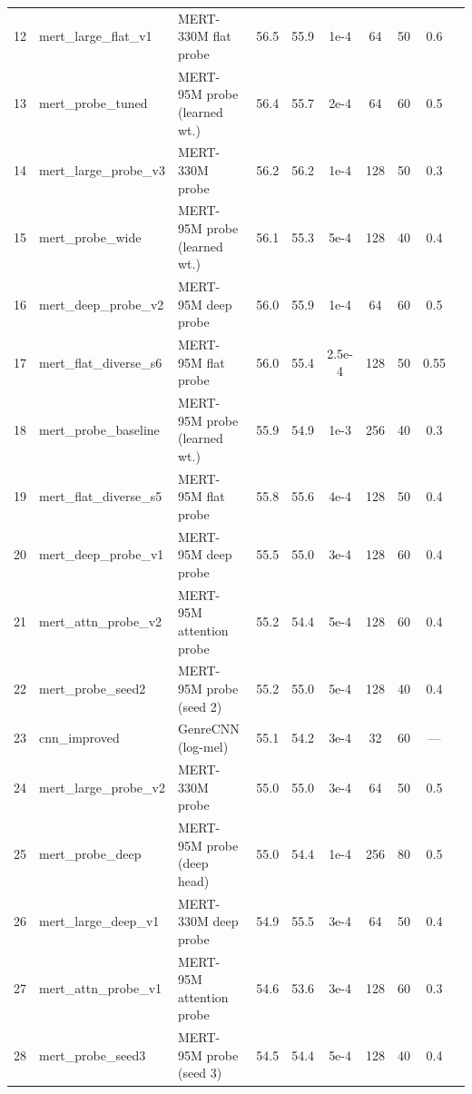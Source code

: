 \documentclass[conference]{IEEEtran}
\begin{document}
\begin{table}[t]
\begin{tabular}{rllccccccl}
12 & mert\_large\_flat\_v1 & MERT-330M flat probe & 56.5 & 55.9 & 1e-4 & 64 & 50 & 0.6 & \cite{li2023mert} \\
13 & mert\_probe\_tuned & MERT-95M probe (learned wt.) & 56.4 & 55.7 & 2e-4 & 64 & 60 & 0.5 & \cite{pasad2021layer} \\
14 & mert\_large\_probe\_v3 & MERT-330M probe & 56.2 & 56.2 & 1e-4 & 128 & 50 & 0.3 & \cite{li2023mert} \\
15 & mert\_probe\_wide & MERT-95M probe (learned wt.) & 56.1 & 55.3 & 5e-4 & 128 & 40 & 0.4 & \cite{pasad2021layer} \\
16 & mert\_deep\_probe\_v2 & MERT-95M deep probe & 56.0 & 55.9 & 1e-4 & 64 & 60 & 0.5 & \cite{yang2021superb} \\
17 & mert\_flat\_diverse\_s6 & MERT-95M flat probe & 56.0 & 55.4 & 2.5e-4 & 128 & 50 & 0.55 & \cite{li2023mert} \\
18 & mert\_probe\_baseline & MERT-95M probe (learned wt.) & 55.9 & 54.9 & 1e-3 & 256 & 40 & 0.3 & \cite{pasad2021layer} \\
19 & mert\_flat\_diverse\_s5 & MERT-95M flat probe & 55.8 & 55.6 & 4e-4 & 128 & 50 & 0.4 & \cite{li2023mert} \\
20 & mert\_deep\_probe\_v1 & MERT-95M deep probe & 55.5 & 55.0 & 3e-4 & 128 & 60 & 0.4 & \cite{yang2021superb} \\
21 & mert\_attn\_probe\_v2 & MERT-95M attention probe & 55.2 & 54.4 & 5e-4 & 128 & 60 & 0.4 & \cite{safari2020self} \\
22 & mert\_probe\_seed2 & MERT-95M probe (seed 2) & 55.2 & 55.0 & 5e-4 & 128 & 40 & 0.4 & \cite{pasad2021layer} \\
23 & cnn\_improved & GenreCNN (log-mel) & 55.1 & 54.2 & 3e-4 & 32 & 60 & --- & \cite{choi2017transfer} \\
24 & mert\_large\_probe\_v2 & MERT-330M probe & 55.0 & 55.0 & 3e-4 & 64 & 50 & 0.5 & \cite{li2023mert} \\
25 & mert\_probe\_deep & MERT-95M probe (deep head) & 55.0 & 54.4 & 1e-4 & 256 & 80 & 0.5 & \cite{pasad2021layer} \\
26 & mert\_large\_deep\_v1 & MERT-330M deep probe & 54.9 & 55.5 & 3e-4 & 64 & 50 & 0.4 & \cite{yang2021superb} \\
27 & mert\_attn\_probe\_v1 & MERT-95M attention probe & 54.6 & 53.6 & 3e-4 & 128 & 60 & 0.3 & \cite{safari2020self} \\
28 & mert\_probe\_seed3 & MERT-95M probe (seed 3) & 54.5 & 54.4 & 5e-4 & 128 & 40 & 0.4 & \cite{pasad2021layer} \\

\end{tabular}
\end{table}
\end{document}
